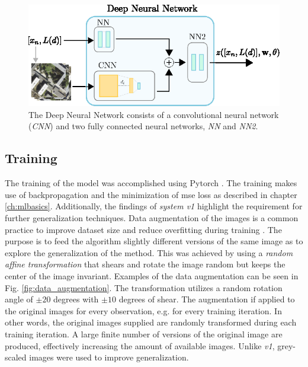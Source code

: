 \begin{figure}
    \centering
    \includegraphics{chapters/part_pathloss/model_aided_paper/setup_model.eps}
    \caption{The Deep Neural Network consists of a convolutional neural network (\emph{CNN}) and two fully connected neural networks, \emph{NN} and \emph{NN2}.}
    \label{fig:satellite_model_setup_v2}
\end{figure}

\subsection{Training}\label{sec:training_v2}
The training of the model was accomplished using Pytorch \cite{Paszke2017AutomaticPyTorch}. The training makes use of backpropagation and the minimization of \gls{mse} loss as described in chapter \ref{ch:mlbasics}. Additionally, the findings of \emph{system v1} highlight the requirement for further generalization techniques. Data augmentation of the images is a common practice to improve dataset size and reduce overfitting during training \cite{Shorten2019ALearning}. The purpose is to feed the algorithm slightly different versions of the same image as to explore the generalization of the method. This was achieved by using a \emph{random  affine  transformation} that shears and rotate the image random but keeps the center of the image invariant. Examples of the data augmentation can be seen in Fig. \ref{fig:data_augmentation}. The transformation utilizes a random rotation angle of $\pm 20$ degrees with $\pm 10$ degrees of shear. The augmentation if applied to the original images for every observation, e.g. for every training iteration. In other words, the original images supplied are randomly transformed during each training iteration. A large finite number of versions of the original image are produced, effectively increasing the amount of available images. Unlike \emph{v1}, grey-scaled images were used to improve generalization. 


